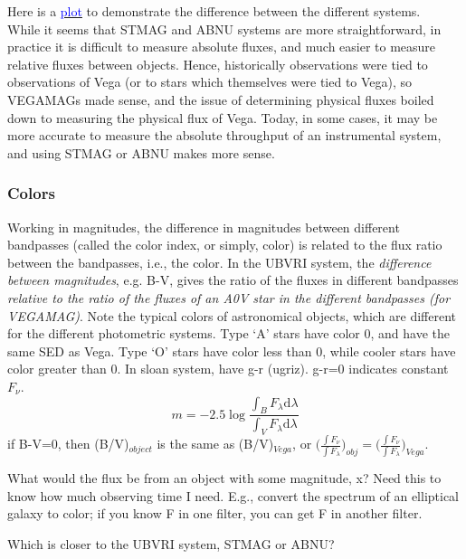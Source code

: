 \documentclass[12pt]{article}
\begin{document}
\noindent Here is a
\href{http://astronomy.nmsu.edu/holtz/a535/html/diagrams/a535/mag.htm}
{\textcolor{blue}{plot}}
to demonstrate the difference between the different systems.\\

\noindent While it seems that STMAG and ABNU systems are more
straightforward, in practice it is difficult to measure absolute
fluxes, and much easier to measure relative fluxes between objects.
Hence, historically observations were tied to observations of Vega (or
to stars which themselves were tied to Vega), so VEGAMAGs made sense,
and the issue of determining physical fluxes boiled down to measuring
the physical flux of Vega. Today, in some cases, it may be more
accurate to measure the absolute throughput of an instrumental system,
and using STMAG or ABNU makes more sense.

\subsubsection*{Colors}
Working in magnitudes, the difference in magnitudes between different
bandpasses (called the color index, or simply, color) is related to
the flux ratio between the bandpasses, i.e., the color.
In the UBVRI
system, the \emph{difference between magnitudes}, e.g. B-V,
gives the ratio of the fluxes in different bandpasses
\emph{relative to the ratio of the fluxes of
an A0V star in the different bandpasses (for VEGAMAG)}.
Note the typical colors of astronomical objects,
which are different for the different photometric systems.
Type `A' stars have color 0, and have the same SED as Vega.
Type `O' stars have color less than 0,
while cooler stars have color greater than 0.
In sloan system, have  g-r (ugriz). g-r=0 indicates constant
$F_{\nu}$.
\begin{equation*}
    m = -2.5\log\frac{\int_B F_{\lambda}\textrm{d}\lambda}
    {\int_V F_{\lambda}\textrm{d}\lambda}
\end{equation*}
if B-V=0, then (B/V)$_{object}$ is the same as (B/V)$_{Vega}$,
or $\Big(\frac{\int F_{\nu}}{\int F_{\lambda}}\Big)_{obj} =
    \Big(\frac{\int F_{\nu}}{\int F_{\lambda}}\Big)_{Vega} $.


What would the flux be from an object with some magnitude,
x? Need this to know how much observing time I need. E.g., convert the
spectrum of an elliptical galaxy to color; if you know F in one
filter, you can get F in another filter.

Which is closer to the UBVRI system, STMAG or ABNU?
\end{document}
